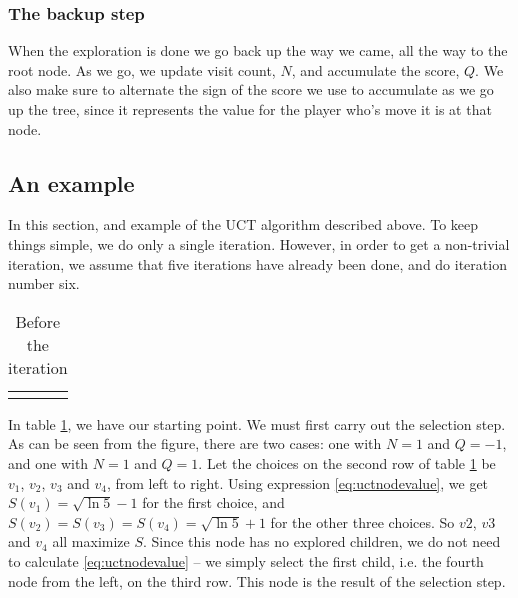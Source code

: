 \subsubsection{The backup step}

When the exploration is done  we go back up the way we came, all the way to the root node.
As we go, we update visit count, $N$, and accumulate the score, $Q$.
We also make sure to alternate the sign of the score we use to accumulate as we go up the tree, since it represents the value for the player who's move it is at that node.

\subsection{An example}
In this section, and example of the UCT algorithm described above.
To keep things simple, we do only a single iteration.
However, in order to get a non-trivial iteration, we assume that five iterations have already been done, and do iteration number six.
\begin{center}
\def\arraystretch{5.5}
\begin{table}
\begin{tabular}{l}
  \def\svgwidth{\columnwidth} 
\end{tabular}
\caption{Before the iteration}
\label{tab:mcts_iteration_before}
\end{table}
\end{center}
In table \ref{tab:mcts_iteration_before}, we have our starting point.
We must first carry out the selection step. As can be seen from the figure, there are two cases: one with $N=1$ and $Q=-1$, and one with $N=1$ and $Q=1$.
Let the choices on the second row of table \ref{tab:mcts_iteration_before} be $v_1$, $v_2$, $v_3$ and $v_4$, from left to right.
Using expression \ref{eq:uctnodevalue}, we get $S(v_1) = \sqrt{\ln{5}} - 1$ for the first choice, and $S(v_2) = S(v_3) = S(v_4) = \sqrt{\ln{5}} + 1$ for the other three choices.
So $v2$, $v3$ and $v_4$ all maximize $S$.
Since this node has no explored children, we do not need to calculate \ref{eq:uctnodevalue} -- we simply select the first child, i.e. the fourth node from the left, on the third row.
This node is the result of the selection step.


